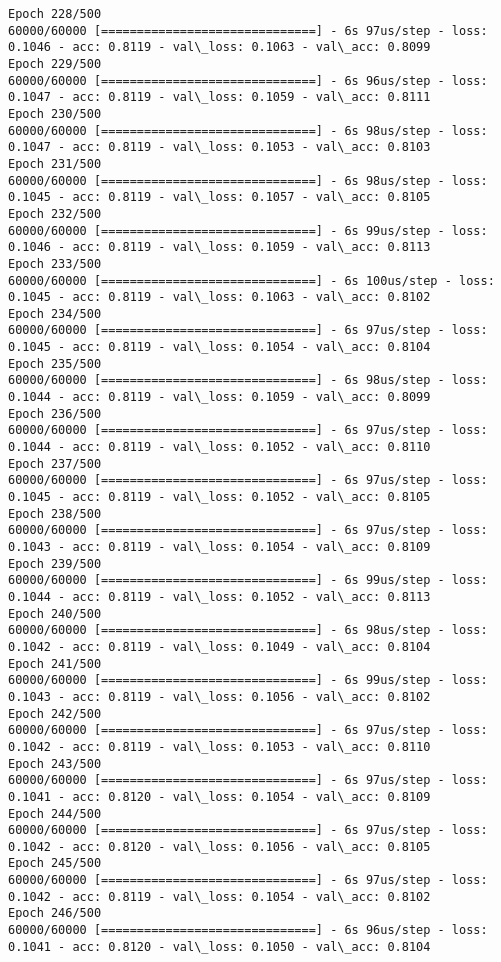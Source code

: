 \documentclass[11pt]{article}
\begin{document}
\begin{Verbatim}[commandchars=\\\{\}]
Epoch 228/500
60000/60000 [==============================] - 6s 97us/step - loss: 0.1046 - acc: 0.8119 - val\_loss: 0.1063 - val\_acc: 0.8099
Epoch 229/500
60000/60000 [==============================] - 6s 96us/step - loss: 0.1047 - acc: 0.8119 - val\_loss: 0.1059 - val\_acc: 0.8111
Epoch 230/500
60000/60000 [==============================] - 6s 98us/step - loss: 0.1047 - acc: 0.8119 - val\_loss: 0.1053 - val\_acc: 0.8103
Epoch 231/500
60000/60000 [==============================] - 6s 98us/step - loss: 0.1045 - acc: 0.8119 - val\_loss: 0.1057 - val\_acc: 0.8105
Epoch 232/500
60000/60000 [==============================] - 6s 99us/step - loss: 0.1046 - acc: 0.8119 - val\_loss: 0.1059 - val\_acc: 0.8113
Epoch 233/500
60000/60000 [==============================] - 6s 100us/step - loss: 0.1045 - acc: 0.8119 - val\_loss: 0.1063 - val\_acc: 0.8102
Epoch 234/500
60000/60000 [==============================] - 6s 97us/step - loss: 0.1045 - acc: 0.8119 - val\_loss: 0.1054 - val\_acc: 0.8104
Epoch 235/500
60000/60000 [==============================] - 6s 98us/step - loss: 0.1044 - acc: 0.8119 - val\_loss: 0.1059 - val\_acc: 0.8099
Epoch 236/500
60000/60000 [==============================] - 6s 97us/step - loss: 0.1044 - acc: 0.8119 - val\_loss: 0.1052 - val\_acc: 0.8110
Epoch 237/500
60000/60000 [==============================] - 6s 97us/step - loss: 0.1045 - acc: 0.8119 - val\_loss: 0.1052 - val\_acc: 0.8105
Epoch 238/500
60000/60000 [==============================] - 6s 97us/step - loss: 0.1043 - acc: 0.8119 - val\_loss: 0.1054 - val\_acc: 0.8109
Epoch 239/500
60000/60000 [==============================] - 6s 99us/step - loss: 0.1044 - acc: 0.8119 - val\_loss: 0.1052 - val\_acc: 0.8113
Epoch 240/500
60000/60000 [==============================] - 6s 98us/step - loss: 0.1042 - acc: 0.8119 - val\_loss: 0.1049 - val\_acc: 0.8104
Epoch 241/500
60000/60000 [==============================] - 6s 99us/step - loss: 0.1043 - acc: 0.8119 - val\_loss: 0.1056 - val\_acc: 0.8102
Epoch 242/500
60000/60000 [==============================] - 6s 97us/step - loss: 0.1042 - acc: 0.8119 - val\_loss: 0.1053 - val\_acc: 0.8110
Epoch 243/500
60000/60000 [==============================] - 6s 97us/step - loss: 0.1041 - acc: 0.8120 - val\_loss: 0.1054 - val\_acc: 0.8109
Epoch 244/500
60000/60000 [==============================] - 6s 97us/step - loss: 0.1042 - acc: 0.8120 - val\_loss: 0.1056 - val\_acc: 0.8105
Epoch 245/500
60000/60000 [==============================] - 6s 97us/step - loss: 0.1042 - acc: 0.8119 - val\_loss: 0.1054 - val\_acc: 0.8102
Epoch 246/500
60000/60000 [==============================] - 6s 96us/step - loss: 0.1041 - acc: 0.8120 - val\_loss: 0.1050 - val\_acc: 0.8104

\end{Verbatim}
\end{document}
